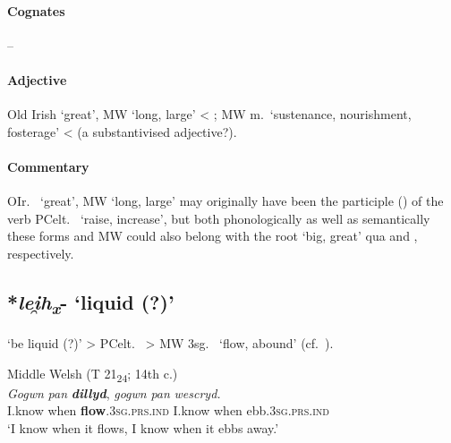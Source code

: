 \documentclass[output=paper,colorlinks,citecolor=brown]{langscibook}
\begin{document}
\paragraph*{Cognates}  -- 

\paragraph*{Adjective}

Old Irish   ‘great’, MW  ‘long, large’ < \mbox{}; MW  m.\ ‘sustenance, nourishment, fosterage’ <  (a substantivised adjective?).

\paragraph*{Commentary}

OIr.\   ‘great’, MW  ‘long, large’ may originally have been the participle () of the verb PCelt.\  ‘raise, increase’, but both phonologically as well as semantically these forms and MW  could also belong with the root  ‘big, great’ qua  and , respectively. 

\subsection{*\textit{lei̯h\textsubscript{x}}- ‘liquid (?)’}
\label{sec:STPliquid}

 ‘be liquid (?)’ > PCelt.\  > MW 3sg.\  ‘flow, abound’ (cf.\ \citealt[372--373]{Schumacher2004}).

\begin{exe}
    \ex Middle Welsh (T 21\textsubscript{24}; 14th c.)\label{ex:STPliquid}\\
        \gll \textit{Gogwn} \textit{pan} {\textbf{\textit{dillyd}}, } \textit{gogwn} \textit{pan} \textit{wescryd.} \\
        I.know when \textbf{flow}.\textsc{3sg.prs.ind} I.know when ebb.\textsc{3sg.prs.ind} \\
        \glt ‘I know when it flows, I know when it ebbs away.’\\
\end{exe}
\end{document}
